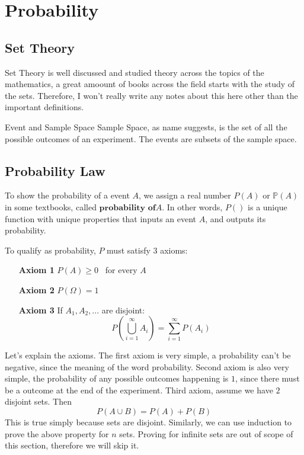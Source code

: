 \chapter{Probability}

\section{Set Theory}
Set Theory is well discussed and studied theory across the topics of the mathematics, a great amoount of books across the field starts with
the study of the sets. Therefore, I won't really write any notes about this here other than the important definitions.
\begin{definition}{Event and Sample Space}
    \alert{Sample Space}, as name suggests, is the set of all the possible outcomes of an experiment. The events are subsets of the sample space.
\end{definition}

\section{Probability Law}
To show the probability of a event $A$, we assign a real number $P(A)$ or $\mathbb{P}(A)$ in some textbooks, called $\textbf{probability of
$A$}$. In other words, $P()$ is a unique function with unique properties that inputs an event $A$, and outputs its probability.
\par
To qualify as probability, $P$ must satisfy $3$ axioms:
\begin{itemize}
    \item[\textbf{Axiom 1}] $P(A) \ge 0$ \ for every $A$
    \item[\textbf{Axiom 2}] $P(\Omega)=1$
    \item[\textbf{Axiom 3}] If $A_1,A_2,...$ are disjoint:
        $$P \left( \bigcup^{\infty}_{i=1} A_i \right)= \sum^{\infty}_{i=1}P(A_i) $$
\end{itemize}

\par
Let's explain the axioms. The first axiom is very simple, a probability can't be negative, since the meaning of the word probability.
Second axiom is also very simple, the probability of any possible outcomes happening is $1$, since there must be a outcome at the end of
the experiment.
Third axiom, assume we have $2$ disjoint sets. Then
$$P(A \cup B)= P(A)+P(B)$$
This is true simply because sets are disjoint. Similarly, we can use induction to prove the above property for $n$ sets. Proving for
infinite sets are out of scope of this section, therefore we will skip it.

